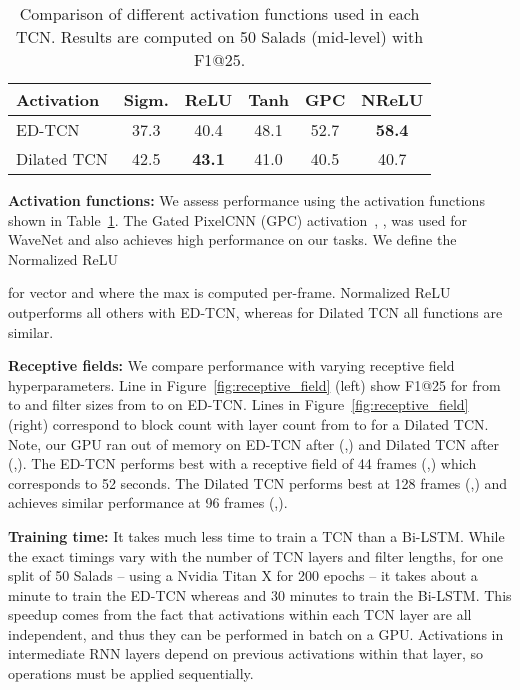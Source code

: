 \documentclass[10pt,twocolumn,letterpaper]{article}
\newcommand{\fakesubsection}[1]{\smallskip\noindent\textbf{#1:}}
\begin{document}
\begin{table}
	\centering
	\begin{tabular}{|l|c|c|c|c|c|}
		\hline
		Activation  & Sigm. &  ReLU & Tanh   & GPC & NReLU  \\
		\hline
		ED-TCN  &  37.3 & 40.4 & 48.1 &   52.7 & \textbf{58.4} \\
		Dilated TCN & 42.5 &\textbf{43.1} &41.0  & 40.5 & 40.7 \\
		\hline
	\end{tabular}
	\label{tab:activations}	
	\caption{Comparison of different activation functions used in each TCN. Results are computed on 50 Salads (mid-level) with F1@25.}
\end{table}


\fakesubsection{Activation functions}
We assess performance using the activation functions shown in Table~\ref{tab:activations}.
The Gated PixelCNN (GPC) activation~\cite{GatedPixelCNN}, , was used for WaveNet and also achieves high performance on our tasks. 
We define the Normalized ReLU 

for vector  and  where the max is computed per-frame.
Normalized ReLU outperforms all others with ED-TCN, whereas for Dilated TCN all functions are similar. 






\fakesubsection{Receptive fields}
We compare performance with varying receptive field hyperparameters. 
Line in Figure~\ref{fig:receptive_field} (left) show F1@25 for  from  to  and filter sizes  from  to  on ED-TCN. 
Lines in Figure~\ref{fig:receptive_field} (right) correspond to block count  with layer count  from  to  for a Dilated TCN. Note, our GPU ran out of memory on ED-TCN after (,) and Dilated TCN after (,).
The ED-TCN performs best with a receptive field of 44 frames (,) which corresponds to 52 seconds. The Dilated TCN performs best at 128 frames (,) and achieves similar performance at 96 frames (,). 







\fakesubsection{Training time}
It takes much less time to train a TCN than a Bi-LSTM. 
While the exact timings vary with the number of TCN layers and filter lengths, for one split of 50 Salads -- using a Nvidia Titan X for 200 epochs -- it takes about a minute to train the ED-TCN whereas and 30 minutes to train the Bi-LSTM. This speedup comes from the fact that activations within each TCN layer are all independent, and thus they can be performed in batch on a GPU. Activations in intermediate RNN layers depend on previous activations within that layer, so operations must be applied sequentially. 
\end{document}
